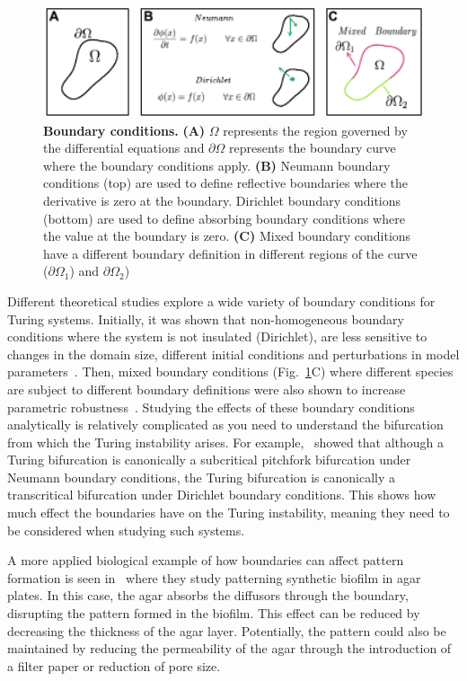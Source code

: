 \begin{figure}[H]
    \centering
    \includegraphics[width=1\textwidth]{chapters/Introduction/boundaries}
    \caption{\textbf{Boundary conditions.} \textbf{(A)} $\Omega$ represents the region governed by the differential equations and $\partial\Omega$ represents the boundary curve where the boundary conditions apply. \textbf{(B)} Neumann boundary conditions (top) are used to define reflective boundaries where the derivative is zero at the boundary. Dirichlet boundary conditions (bottom) are used to define absorbing boundary conditions where the value at the boundary is zero. \textbf{(C)} Mixed boundary conditions have a different boundary definition in different regions of the curve ($\partial\Omega_1$) and $\partial\Omega_2$)  }
    \label{fig:boundaries}
\end{figure}

Different theoretical studies explore a wide variety of boundary conditions for Turing systems.
Initially, it was shown that non-homogeneous boundary conditions where the system is not insulated (Dirichlet), are less sensitive to changes in the domain size, different initial conditions and perturbations in model parameters~\parencite{Arcuri1986}.
Then, mixed boundary conditions (Fig.~\ref{fig:boundaries}C) where different species are subject to different boundary definitions were also shown to increase parametric robustness~\parencite{Maini1993, Maini1997, Krause2021}.
Studying the effects of these boundary conditions analytically is relatively complicated as you need to understand the bifurcation from which the Turing instability arises.
For example,~\cite{Woolley2022} showed that although a Turing bifurcation is canonically a subcritical pitchfork bifurcation under Neumann boundary conditions, the Turing bifurcation is canonically a transcritical bifurcation under Dirichlet boundary conditions.
This shows how much effect the boundaries have on the Turing instability, meaning they need to be considered when studying such systems.

A more applied biological example of how boundaries can affect pattern formation is seen in~\parencite{Krause2020} where they study patterning synthetic biofilm in agar plates.
In this case, the agar absorbs the diffusors through the boundary, disrupting the pattern formed in the biofilm.
This effect can be reduced by decreasing the thickness of the agar layer.
Potentially, the pattern could also be maintained by reducing the permeability of the agar through the introduction of a filter paper or reduction of pore size.

